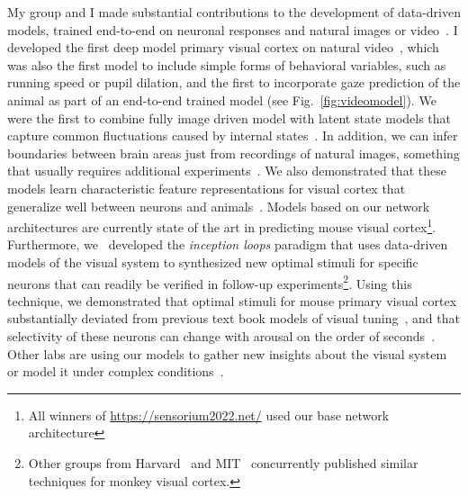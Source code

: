 \documentclass[B2,COG]{ercgrant}
\begin{document}
My group and I made substantial contributions to the development of data-driven models, trained end-to-end on neuronal responses and natural images or video~\parencite{Sinz2018-sk, Walker2019-yw, Lurz2020-ua, Bashiri2021-or, Lurz2022-up, Franke2022-do, Cobos2022-rr, Ecker2018-gz,Cadena2019-jw}. 
I developed the first deep model primary visual cortex on natural video~\parencite{Sinz2018-sk}, which was also the first model to include simple forms of behavioral variables, such as running speed or pupil dilation, and the first to incorporate gaze prediction of the animal as part of an end-to-end trained model (see Fig.~\ref{fig:videomodel}). 
We were the first to combine fully image driven model with latent state models that capture common fluctuations caused by internal states~\parencite{Bashiri2021-or}.
In addition, we can infer boundaries between brain areas just from recordings of natural images, something that usually requires additional experiments~\parencite{Bashiri2021-or}.
We also demonstrated that these models learn characteristic feature representations for visual cortex that generalize well between neurons and animals~\parencite{Lurz2020-ua,Cobos2022-rr}.
Models based on our network architectures are currently state of the art in predicting mouse visual cortex\footnote{All winners of  \url{https://sensorium2022.net/} used our base network architecture}. 
Furthermore, we~\parencite{Walker2019-yw} developed the \textit{inception loops} paradigm that uses data-driven models of the visual system to synthesized new optimal stimuli for specific neurons that can readily be verified in follow-up experiments\footnote{Other groups from Harvard~\parencite{Ponce2019-yn} and MIT~\parencite{Bashivan2019-ry} concurrently published similar techniques for monkey visual cortex.}. 
Using this technique, we demonstrated that optimal stimuli for mouse primary visual cortex substantially deviated from previous text book models of visual tuning~\parencite{Hubel1959-zs}, and that selectivity of these neurons can change with arousal on the order of seconds~\parencite{Franke2022-do}.
Other labs are using our models to gather new insights about the visual system~\parencite{Hofling2022-wr} or model it under complex conditions~\parencite{Parker2022-ac}.
\end{document}
